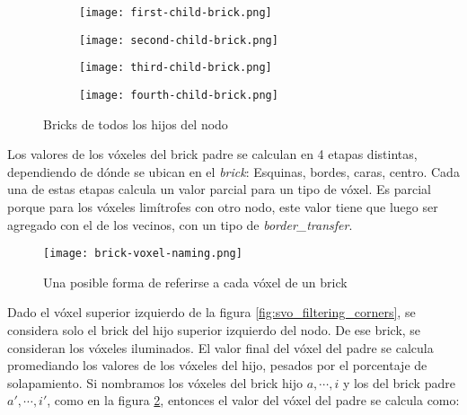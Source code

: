 \begin{figure}[h!]
    \begin{center}
        \begin{subfigure}{.24\textwidth}
            \texttt{[image: first-child-brick.png]}
        \end{subfigure}
        \begin{subfigure}{.24\textwidth}
            \texttt{[image: second-child-brick.png]}
        \end{subfigure}
        \begin{subfigure}{.24\textwidth}
            \texttt{[image: third-child-brick.png]}
        \end{subfigure}
        \begin{subfigure}{.24\textwidth}
            \texttt{[image: fourth-child-brick.png]}
        \end{subfigure}
    \end{center}
    \caption{Bricks de todos los hijos del nodo}
    \label{fig:all_child_bricks}
\end{figure}

Los valores de los vóxeles del brick padre se calculan en 4 etapas distintas, dependiendo de dónde se ubican en el \textit{brick}: Esquinas, bordes, caras, centro.
Cada una de estas etapas calcula un valor parcial para un tipo de vóxel.
Es parcial porque para los vóxeles limítrofes con otro nodo, este valor tiene que luego ser agregado con el de los vecinos, con un tipo de \textit{border\_transfer}.


\begin{figure}
    \centering
    \texttt{[image: brick-voxel-naming.png]}
    \caption{Una posible forma de referirse a cada vóxel de un brick}
    \label{fig:brick-voxel-naming}
\end{figure}

Dado el vóxel superior izquierdo de la figura \ref{fig:svo_filtering_corners}, se considera solo el brick del hijo superior izquierdo del nodo.
De ese brick, se consideran los vóxeles iluminados.
El valor final del vóxel del padre se calcula promediando los valores de los vóxeles del hijo, pesados por el porcentaje de solapamiento.
Si nombramos los vóxeles del brick hijo $a, \cdots, i$ y los del brick padre $a', \cdots, i'$, como en la figura \ref{fig:brick-voxel-naming}, entonces el valor del vóxel del padre se calcula como:

